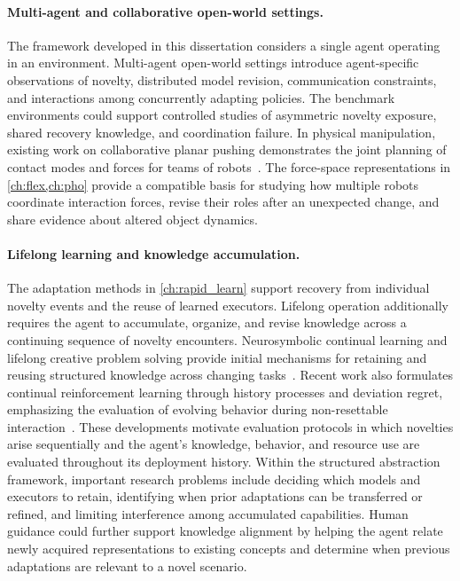 \paragraph{Multi-agent and collaborative open-world settings.}
The framework developed in this dissertation considers a single agent operating in an environment. Multi-agent open-world settings introduce agent-specific observations of novelty, distributed model revision, communication constraints, and interactions among concurrently adapting policies. The benchmark environments could support controlled studies of asymmetric novelty exposure, shared recovery knowledge, and coordination failure. In physical manipulation, existing work on collaborative planar pushing demonstrates the joint planning of contact modes and forces for teams of robots~\citep{tang2024collaborative}. The force-space representations in \cref{ch:flex,ch:pho} provide a compatible basis for studying how multiple robots coordinate interaction forces, revise their roles after an unexpected change, and share evidence about altered object dynamics.

\paragraph{Lifelong learning and knowledge accumulation.}
The adaptation methods in \cref{ch:rapid_learn} support recovery from individual novelty events and the reuse of learned executors. Lifelong operation additionally requires the agent to accumulate, organize, and revise knowledge across a continuing sequence of novelty encounters. Neurosymbolic continual learning and lifelong creative problem solving provide initial mechanisms for retaining and reusing structured knowledge across changing tasks~\citep{lorang2024goalconditioned,gizzi2022lifelong}. Recent work also formulates continual reinforcement learning through history processes and deviation regret, emphasizing the evaluation of evolving behavior during non-resettable interaction~\citep{elelimy2025rethinking}. These developments motivate evaluation protocols in which novelties arise sequentially and the agent's knowledge, behavior, and resource use are evaluated throughout its deployment history. Within the structured abstraction framework, important research problems include deciding which models and executors to retain, identifying when prior adaptations can be transferred or refined, and limiting interference among accumulated capabilities. Human guidance could further support knowledge alignment by helping the agent relate newly acquired representations to existing concepts and determine when previous adaptations are relevant to a novel scenario.
